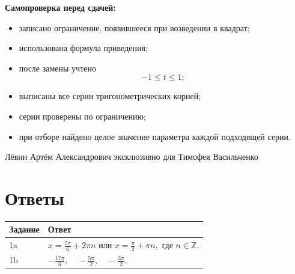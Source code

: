 \documentclass[a4paper,12pt]{article}
\newcommand{\Z}{\mathbb{Z}}
\begin{document}
\vspace{1em}

\textbf{Самопроверка перед сдачей:}

\begin{itemize}

  \item
  записано ограничение, появившееся при возведении в квадрат;

  \item
  использована формула приведения;

  \item
  после замены учтено
  \[
  -1\le t\le1;
  \]

  \item
  выписаны все серии тригонометрических корней;

  \item
  серии проверены по ограничению;

  \item
  при отборе найдено целое значение параметра каждой подходящей серии.

\end{itemize}

\vfill

\begin{center}
\small
\color{darkaccent}
Лёвин Артём Александрович эксклюзивно для Тимофея Васильченко
\end{center}


\clearpage

\section*{Ответы}

\renewcommand{\arraystretch}{1.45}

\begin{table}[ht]
\centering

\begin{tabularx}{\linewidth}{@{}p{2.1cm}X@{}}

\toprule

\textbf{Задание}
&
\textbf{Ответ}
\\

\midrule

1a
&
\(
\displaystyle
x=\frac{7\pi}{6}+2\pi n
\)
или
\(
\displaystyle
x=\frac{\pi}{2}+\pi n,
\)
где
\(
n\in\Z.
\)
\\

\addlinespace

1b
&
\(
\displaystyle
-\frac{17\pi}{6},
\quad
-\frac{5\pi}{2},
\quad
-\frac{3\pi}{2}.
\)
\\

\bottomrule

\end{tabularx}
\end{table}
\end{document}

